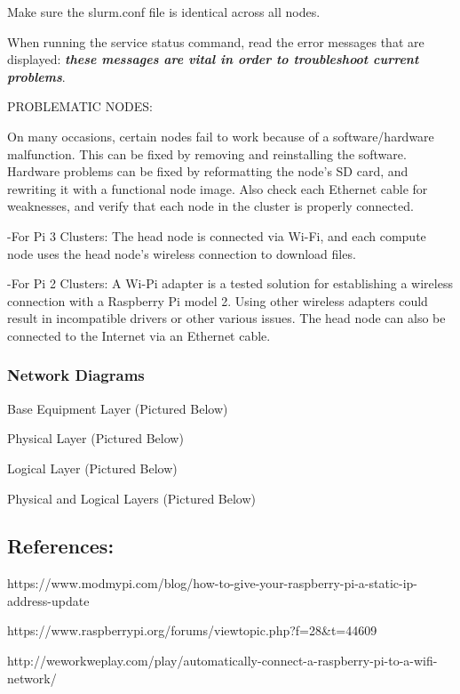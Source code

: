 \documentclass[]{article}
\begin{document}
Make sure the slurm.conf file is identical across all nodes.

When running the service status command, read the error messages that
are displayed: \emph{\textbf{these messages are vital in order to
troubleshoot current problems}}.

PROBLEMATIC NODES:

On many occasions, certain nodes fail to work because of a
software/hardware malfunction. This can be fixed by removing and
reinstalling the software. Hardware problems can be fixed by
reformatting the node's SD card, and rewriting it with a functional node
image. Also check each Ethernet cable for weaknesses, and verify that
each node in the cluster is properly connected.

-For Pi 3 Clusters: The head node is connected via Wi-Fi, and each
compute node uses the head node's wireless connection to download files.

-For Pi 2 Clusters: A Wi-Pi adapter is a tested solution for
establishing a wireless connection with a Raspberry Pi model 2. Using
other wireless adapters could result in incompatible drivers or other
various issues. The head node can also be connected to the Internet via
an Ethernet cable.

\subsubsection{Network Diagrams}\label{network-diagrams}

Base Equipment Layer (Pictured Below)

Physical Layer (Pictured Below)

Logical Layer (Pictured Below)

Physical and Logical Layers (Pictured Below)

\subsection{}\label{section}

\subsection{References:}\label{references}

https://www.modmypi.com/blog/how-to-give-your-raspberry-pi-a-static-ip-address-update

https://www.raspberrypi.org/forums/viewtopic.php?f=28\&t=44609

http://weworkweplay.com/play/automatically-connect-a-raspberry-pi-to-a-wifi-network/
\end{document}
